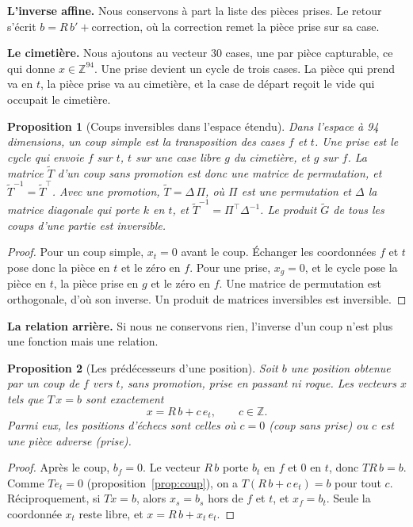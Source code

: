 \documentclass[11pt,a4paper]{article}
\theoremstyle{plain}
\newtheorem{proposition}{Proposition}
\begin{document}
\textbf{L'inverse affine.} Nous conservons à part la liste des pièces prises. Le retour s'écrit
$b = R\,b' + \text{correction}$, où la correction remet la pièce prise sur sa case.

\textbf{Le cimetière.} Nous ajoutons au vecteur 30 cases, une par pièce capturable, ce qui donne
$x\in\mathbb{Z}^{94}$. Une prise devient un cycle de trois cases. La pièce qui prend va en $t$, la
pièce prise va au cimetière, et la case de départ reçoit le vide qui occupait le cimetière.

\begin{proposition}[Coups inversibles dans l'espace étendu]\label{prop:cimetiere}
Dans l'espace à 94 dimensions, un coup simple est la transposition des cases $f$ et $t$. Une
prise est le cycle qui envoie $f$ sur $t$, $t$ sur une case libre $g$ du cimetière, et $g$ sur
$f$. La matrice $\tilde T$ d'un coup sans promotion est donc une matrice de permutation, et
$\tilde T^{-1} = \tilde T^{\top}$. Avec une promotion, $\tilde T = \Delta\,\Pi$, où $\Pi$ est une
permutation et $\Delta$ la matrice diagonale qui porte $k$ en $t$, et
$\tilde T^{-1} = \Pi^{\top} \Delta^{-1}$. Le produit $\tilde G$ de tous les coups d'une partie est
inversible.
\end{proposition}
\begin{proof}
Pour un coup simple, $x_t = 0$ avant le coup. Échanger les coordonnées $f$ et $t$ pose donc la
pièce en $t$ et le zéro en $f$. Pour une prise, $x_g = 0$, et le cycle pose la pièce en $t$, la
pièce prise en $g$ et le zéro en $f$. Une matrice de permutation est orthogonale, d'où son
inverse. Un produit de matrices inversibles est inversible.
\end{proof}

\textbf{La relation arrière.} Si nous ne conservons rien, l'inverse d'un coup n'est plus une
fonction mais une relation.

\begin{proposition}[Les prédécesseurs d'une position]\label{prop:arriere}
Soit $b$ une position obtenue par un coup de $f$ vers $t$, sans promotion, prise en passant ni
roque. Les vecteurs $x$ tels que $T\,x = b$ sont exactement
\[ x = R\,b + c\,e_t,\qquad c \in \mathbb{Z}. \]
Parmi eux, les positions d'échecs sont celles où $c = 0$ (coup sans prise) ou $c$ est une pièce
adverse (prise).
\end{proposition}
\begin{proof}
Après le coup, $b_f = 0$. Le vecteur $R\,b$ porte $b_t$ en $f$ et 0 en $t$, donc $T R\,b = b$.
Comme $T e_t = 0$ (proposition~\ref{prop:coup}), on a $T(R\,b + c\,e_t) = b$ pour tout $c$.
Réciproquement, si $T x = b$, alors $x_s = b_s$ hors de $f$ et $t$, et $x_f = b_t$. Seule la
coordonnée $x_t$ reste libre, et $x = R\,b + x_t\,e_t$.
\end{proof}
\end{document}
